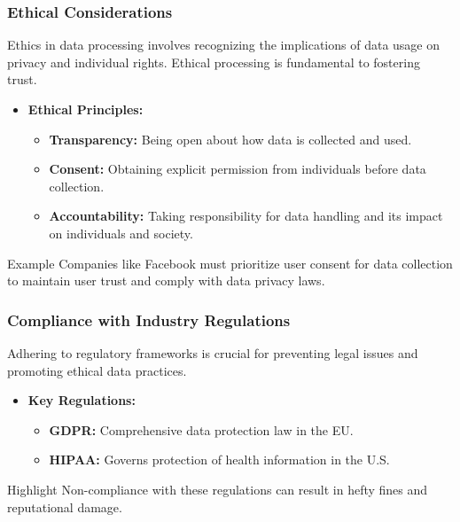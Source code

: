\documentclass{beamer}
\begin{document}
\begin{frame}[fragile]
    \frametitle{Ethical Considerations}
    Ethics in data processing involves recognizing the implications of data usage on privacy and individual rights. Ethical processing is fundamental to fostering trust.

    \begin{itemize}
        \item \textbf{Ethical Principles:}
        \begin{itemize}
            \item \textbf{Transparency:} Being open about how data is collected and used.
            \item \textbf{Consent:} Obtaining explicit permission from individuals before data collection.
            \item \textbf{Accountability:} Taking responsibility for data handling and its impact on individuals and society.
        \end{itemize}
    \end{itemize}

    \begin{block}{Example}
        Companies like Facebook must prioritize user consent for data collection to maintain user trust and comply with data privacy laws.
    \end{block}
\end{frame}

\begin{frame}[fragile]
    \frametitle{Compliance with Industry Regulations}
    Adhering to regulatory frameworks is crucial for preventing legal issues and promoting ethical data practices.

    \begin{itemize}
        \item \textbf{Key Regulations:}
        \begin{itemize}
            \item \textbf{GDPR:} Comprehensive data protection law in the EU.
            \item \textbf{HIPAA:} Governs protection of health information in the U.S.
        \end{itemize}
    \end{itemize}

    \begin{block}{Highlight}
        Non-compliance with these regulations can result in hefty fines and reputational damage.
    \end{block}
\end{frame}
\end{document}
